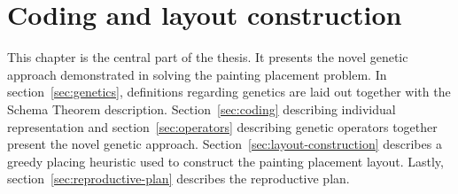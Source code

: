 \chapter{Coding and layout construction}\label{ch:coding-and-layout-construction}

This chapter is the central part of the thesis.
It presents the novel genetic approach demonstrated in solving the painting placement problem.
In section~\ref{sec:genetics}, definitions regarding genetics are laid out together with the Schema Theorem description.
Section~\ref{sec:coding} describing individual representation and section~\ref{sec:operators}
describing genetic operators together present the novel genetic approach.
Section~\ref{sec:layout-construction} describes a greedy placing heuristic used to construct the painting placement layout.
Lastly, section~\ref{sec:reproductive-plan} describes the reproductive plan.







